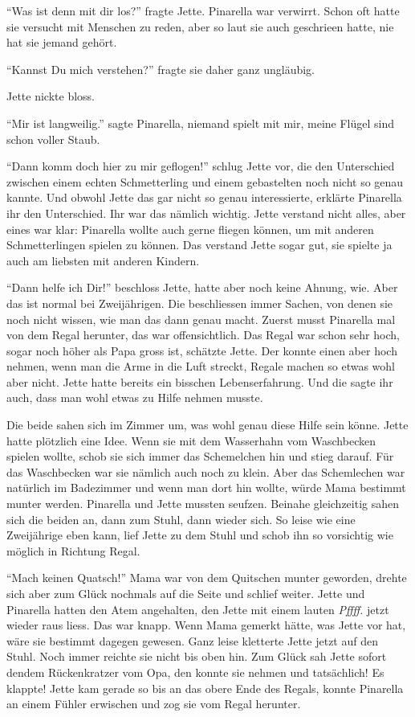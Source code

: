 \enquote{Was ist denn mit dir los?} fragte Jette. Pinarella war verwirrt. Schon oft hatte sie versucht mit Menschen zu reden, aber so laut sie auch geschrieen hatte, nie hat sie jemand gehört.

\enquote{Kannst Du mich verstehen?} fragte sie daher ganz ungläubig. 

Jette nickte bloss. 

\enquote{Mir ist langweilig.} sagte Pinarella, niemand spielt mit mir, meine Flügel sind schon voller Staub.

\enquote{Dann komm doch hier zu mir geflogen!} schlug Jette vor, die den Unterschied zwischen einem echten Schmetterling und einem gebastelten noch nicht so genau kannte. Und obwohl Jette das gar nicht so genau interessierte, erklärte Pinarella ihr den Unterschied. Ihr war das nämlich wichtig. Jette verstand nicht alles, aber eines war klar: Pinarella wollte auch gerne fliegen können, um mit anderen Schmetterlingen spielen zu können. Das verstand Jette sogar gut, sie spielte ja auch am liebsten mit anderen Kindern.

\enquote{Dann helfe ich Dir!} beschloss Jette, hatte aber noch keine Ahnung, wie. Aber das ist normal bei Zweijährigen. Die beschliessen immer Sachen, von denen sie noch nicht wissen, wie man das dann genau macht. Zuerst musst Pinarella mal von dem Regal herunter, das war offensichtlich. Das Regal war schon sehr hoch, sogar noch höher als Papa gross ist, schätzte Jette. Der konnte einen aber hoch nehmen, wenn man die Arme in die Luft streckt, Regale machen so etwas wohl aber nicht. Jette hatte bereits ein bisschen Lebenserfahrung. Und die sagte ihr auch, dass man wohl etwas zu Hilfe nehmen musste.

Die beide sahen sich im Zimmer um, was wohl genau diese Hilfe sein könne. Jette hatte plötzlich eine Idee. Wenn sie mit dem Wasserhahn vom Waschbecken spielen wollte, schob sie sich immer das Schemelchen hin und stieg darauf. Für das Waschbecken war sie nämlich auch noch zu klein.  Aber das Schemlechen war natürlich im Badezimmer und wenn man dort hin wollte, würde Mama bestimmt munter werden. Pinarella und Jette mussten seufzen. Beinahe gleichzeitig sahen sich die beiden an, dann zum Stuhl, dann wieder sich. So leise wie eine Zweijährige eben kann, lief Jette zu dem Stuhl und schob ihn so vorsichtig wie möglich in Richtung Regal.

\enquote{Mach keinen Quatsch!} Mama war von dem Quitschen munter geworden, drehte sich aber zum Glück nochmals auf die Seite und schlief weiter. Jette und Pinarella hatten den Atem angehalten, den Jette mit einem lauten {\it Pffff.} jetzt wieder raus liess. Das war knapp. Wenn Mama gemerkt hätte, was Jette vor hat, wäre sie bestimmt dagegen gewesen. Ganz leise kletterte Jette jetzt auf den Stuhl. Noch immer reichte sie nicht bis oben hin. Zum Glück sah Jette sofort dendem Rückenkratzer vom Opa, den konnte sie nehmen und tatsächlich! Es klappte! Jette kam gerade so bis an das obere Ende des Regals, konnte Pinarella an einem Fühler erwischen und zog sie vom Regal herunter.

